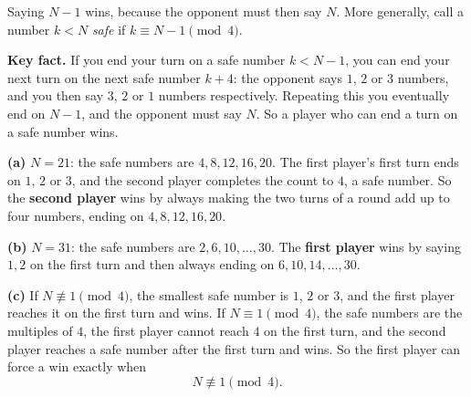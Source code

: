 Saying $N-1$ wins, because the opponent must then say $N$. More generally, call a number $k<N$ \emph{safe} if $k\equiv N-1\pmod4$.

\textbf{Key fact.} If you end your turn on a safe number $k<N-1$, you can end your next turn on the next safe number $k+4$: the opponent says $1$, $2$ or $3$ numbers, and you then say $3$, $2$ or $1$ numbers respectively. Repeating this you eventually end on $N-1$, and the opponent must say $N$. So a player who can end a turn on a safe number wins.

\textbf{(a)} $N=21$: the safe numbers are $4,8,12,16,20$. The first player's first turn ends on $1$, $2$ or $3$, and the second player completes the count to $4$, a safe number. So the \textbf{second player} wins by always making the two turns of a round add up to four numbers, ending on $4,8,12,16,20$.

\textbf{(b)} $N=31$: the safe numbers are $2,6,10,\dots,30$. The \textbf{first player} wins by saying $1,2$ on the first turn and then always ending on $6,10,14,\dots,30$.

\textbf{(c)} If $N\not\equiv1\pmod4$, the smallest safe number is $1$, $2$ or $3$, and the first player reaches it on the first turn and wins. If $N\equiv1\pmod4$, the safe numbers are the multiples of $4$, the first player cannot reach $4$ on the first turn, and the second player reaches a safe number after the first turn and wins. So the first player can force a win exactly when
\[
\boxed{N\not\equiv1\pmod 4}.
\]
